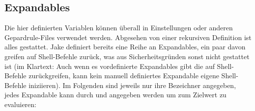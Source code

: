 \subsection{Expandables}
Die hier definierten Variablen können überall in Einstellungen oder anderen Gepardrule-Files verwendet werden. Abgesehen von einer rekursiven Definition ist alles gestattet. Jake definiert bereits eine Reihe an Expandables, ein paar davon greifen auf Shell-Befehle zurück, was aus Sicherheitsgründen sonst nicht gestattet ist (im Klartext: Auch wenn es vordefinierte Expandables gibt die auf Shell-Befehle zurückgreifen, kann kein manuell definiertes Expandable eigene Shell-Befehle iniziieren). Im Folgenden sind jeweils nur ihre Bezeichner angegeben, jedes Expandable kann durch \T{\$[<Name>]} und  angegeben werden um zum Zielwert zu evaluieren:
